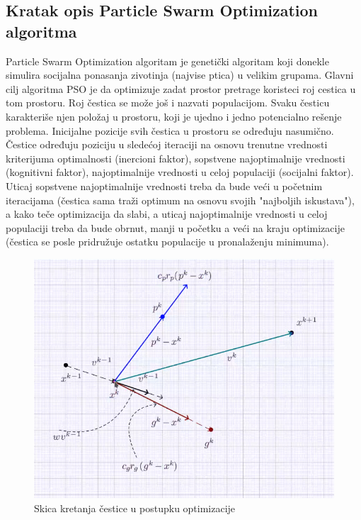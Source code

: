 \documentclass[12pt, a4paper]{article}
\begin{document}
    \subsection{Kratak opis Particle Swarm Optimization algoritma}
    Particle Swarm Optimization algoritam je genetički algoritam koji donekle simulira socijalna ponasanja zivotinja (najvise ptica) u velikim grupama. 
    Glavni cilj algoritma PSO je da optimizuje zadat prostor pretrage koristeci roj cestica u tom prostoru. 
    Roj čestica se može još i nazvati populacijom. Svaku česticu karakteriše njen položaj u prostoru, koji je ujedno i jedno potencialno rešenje problema. 
    Inicijalne pozicije svih čestica u prostoru se određuju nasumično. 
    Čestice određuju poziciju u sledećoj iteraciji na osnovu trenutne vrednosti kriterijuma optimalnosti (inercioni faktor), sopstvene najoptimalnije vrednosti (kognitivni faktor), najoptimalnije vrednosti u celoj populaciji (socijalni faktor).
    Uticaj sopstvene najoptimalnije vrednosti treba da bude veći u početnim iteracijama (čestica sama traži optimum na osnovu svojih "najboljih iskustava"), a kako teče optimizacija da slabi, a uticaj najoptimalnije vrednosti u celoj populaciji treba da bude obrnut, manji u početku a veći na kraju optimizacije (čestica se posle pridružuje ostatku populacije u pronalaženju minimuma). \\
    \begin{figure}[h]
        \centering
        \includegraphics[scale=0.5]{PSO - skica kretanja.png}
        \caption{Skica kretanja čestice u postupku optimizacije}
        \label{fig:Walking sketch}
    \end{figure}
    
\end{document}
